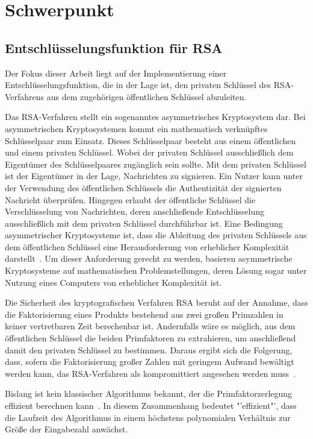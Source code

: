 \section{Schwerpunkt}
\subsection{Entschlüsselungsfunktion für RSA} 
Der Fokus dieser Arbeit liegt auf der Implementierung einer Entschlüsselungsfunktion, die in der Lage ist, 
den privaten Schlüssel des RSA-Verfahrens aus dem zugehörigen öffentlichen Schlüssel abzuleiten.

Das RSA-Verfahren stellt ein sogenanntes asymmetrisches Kryptosystem dar.
Bei asymmetrischen Kryptosystemen kommt ein mathematisch verknüpftes Schlüsselpaar zum Einsatz. 
Dieses Schlüsselpaar besteht aus einem öffentlichen und einem privaten Schlüssel.
Wobei der privaten Schlüssel ausschließlich dem Eigentümer des Schlüsselpaares zugänglich sein sollte.
Mit dem privaten Schlüssel ist der Eigentümer in der Lage, Nachrichten zu signieren. 
Ein Nutzer kann unter der Verwendung des öffentlichen Schlüssels die Authentizität der signierten Nachricht überprüfen. 
Hingegen erlaubt der öffentliche Schlüssel die Verschlüsselung von Nachrichten, 
deren anschließende Entschlüsselung ausschließlich mit dem privaten Schlüssel durchführbar ist.
Eine Bedingung asymmetrischer Kryptosysteme ist, 
dass die Ableitung des privaten Schlüssels aus dem öffentlichen Schlüssel eine Herausforderung von erheblicher Komplexität darstellt~\cite{1055638}. 
Um dieser Anforderung gerecht zu werden, basieren asymmetrische Kryptosysteme auf mathematischen Problemstellungen, 
deren Lösung sogar unter Nutzung eines Computers von erheblicher Komplexität ist.

Die Sicherheit des kryptografischen Verfahren RSA beruht auf der Annahme,
dass die Faktorisierung eines Produkts bestehend aus zwei großen Primzahlen in keiner vertretbaren Zeit berechenbar ist.
Andernfalls wäre es möglich, aus dem öffentlichen Schlüssel die beiden Primfaktoren zu extrahieren, 
um anschließend damit den privaten Schlüssel zu bestimmen.
Daraus ergibt sich die Folgerung, dass, sofern die Faktorisierung großer Zahlen mit geringem Aufwand bewältigt werden kann, 
das RSA-Verfahren als kompromittiert angesehen werden muss~\cite{Cormen2009}.

Bislang ist kein klassischer Algorithmus bekannt, der die Primfaktorzerlegung effizient berechnen kann~\cite{Hoever2022Krypto}.
In diesem Zusammenhang bedeutet "'effizient"', dass die Laufzeit des Algorithmus in einem höchstens polynomialen Verhältnis zur Größe der Eingabezahl anwächst.

